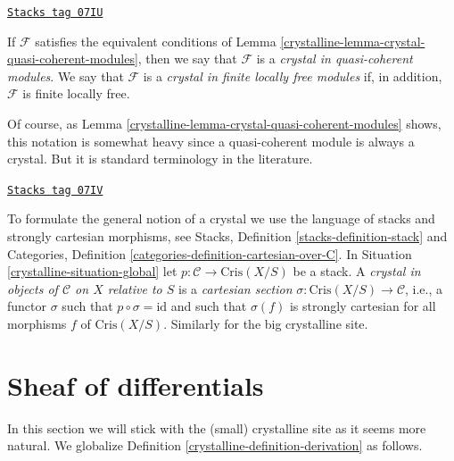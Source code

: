 \begin{definition}
\label{crystalline-definition-crystal-quasi-coherent-modules}
\href{https://stacks.math.columbia.edu/tag/07IU}{\texttt{Stacks tag 07IU}}

If $\mathcal{F}$ satisfies the equivalent conditions of
Lemma \ref{crystalline-lemma-crystal-quasi-coherent-modules}, then
we say that $\mathcal{F}$ is a
{\it crystal in quasi-coherent modules}.
We say that $\mathcal{F}$ is a {\it crystal in finite locally free modules}
if, in addition, $\mathcal{F}$ is finite locally free.
\end{definition}

Of course, as Lemma \ref{crystalline-lemma-crystal-quasi-coherent-modules} shows, this
notation is somewhat heavy since a quasi-coherent module is always a crystal.
But it is standard terminology in the literature.

\begin{remark}[Crystal]
\label{crystalline-remark-crystal}
\href{https://stacks.math.columbia.edu/tag/07IV}{\texttt{Stacks tag 07IV}}

To formulate the general notion of a crystal we use the language
of stacks and strongly cartesian morphisms, see
Stacks, Definition \ref{stacks-definition-stack} and
Categories, Definition \ref{categories-definition-cartesian-over-C}.
In Situation \ref{crystalline-situation-global} let
$p : \mathcal{C} \to \text{Cris}(X/S)$ be a stack.
A {\it crystal in objects of $\mathcal{C}$ on $X$ relative to $S$}
is a {\it cartesian section} $\sigma : \text{Cris}(X/S) \to \mathcal{C}$,
i.e., a functor $\sigma$ such that $p \circ \sigma = \text{id}$
and such that $\sigma(f)$ is strongly cartesian for all
morphisms $f$ of $\text{Cris}(X/S)$. Similarly for the big crystalline site.
\end{remark}

\section{Sheaf of differentials}
\label{crystalline-section-differentials-sheaf}
In this section we will stick with the (small) crystalline site
as it seems more natural. We globalize
Definition \ref{crystalline-definition-derivation} as follows.

